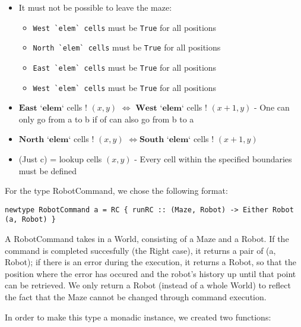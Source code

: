 \documentclass[a4paper]{article}
\newcommand{\west}{\ensuremath{\textbf{West}}}
\newcommand{\east}{\ensuremath{\textbf{East}}}
\newcommand{\south}{\ensuremath{\textbf{South}}}
\newcommand{\north}{\ensuremath{\textbf{North}}}
\newcommand{\el}{\ensuremath{\textbf{ `elem` }}}
\begin{document}
\begin{itemize}
  \item It must not be possible to leave the maze:
    \begin{itemize}\setlength{\itemsep}{-2pt}
      \item \verb|West `elem` cells| must be \texttt{True} for all positions 
      \item \verb|North `elem` cells| must be \texttt{True} for all positions 
      \item \verb|East `elem` cells| must be \texttt{True} for all positions 
      \item \verb|West `elem` cells| must be \texttt{True} for all positions 
    \end{itemize}
  \item \east \el cells ! $(x, y)$ $\Leftrightarrow$ \west \el cells ! $(x+1, y)$ - One can only go from a to b if of can also go from b to a
  \item \north \el cells ! $(x, y)$ $\Leftrightarrow$\south \el cells ! $(x+1, y)$
  \item (Just c) = lookup cells $(x,y)$ - Every cell within the specified boundaries must be defined
\end{itemize}

For the type RobotCommand, we chose the following format:
\begin{verbatim}
newtype RobotCommand a = RC { runRC :: (Maze, Robot) -> Either Robot (a, Robot) }
\end{verbatim}
A RobotCommand takes in a World, consisting of a Maze and a Robot. If the command is completed succesfully (the Right case), it returns a pair of (a, Robot); if there is an error during the execution, it returns a Robot, so that the position where the error has occured and the robot's history up until that point can be retrieved. We only return a Robot (instead of a whole World) to reflect the fact that the Maze cannot be changed through command execution.

In order to make this type a monadic instance, we created two functions:
\end{document}
